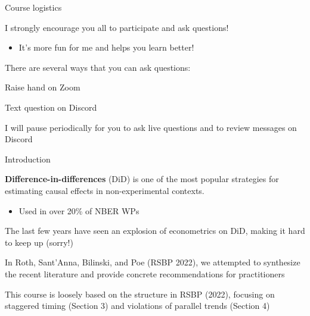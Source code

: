 \documentclass[usenames, dvipsnames, aspectratio = 169, 13pt]{beamer}
\newenvironment{wideitemize}{\itemize\addtolength{\itemsep}{10pt}}{\enditemize}
\begin{document}
\begin{frame}{Course logistics}
    \begin{wideitemize}
        \item
        I strongly encourage you all to participate and ask questions!
            \begin{itemize}
                \item 
                It's more fun for me and helps you learn better!
            \end{itemize}    
        \item
        There are several ways that you can ask questions:
        
            \begin{wideitemize}
                \item
                Raise hand on Zoom
                
                \item
                Text question on Discord
            \end{wideitemize}
            
        \item
        I will pause periodically for you to ask live questions and to review messages on Discord
    \end{wideitemize}
    
\end{frame}


\begin{frame}{Introduction}
\begin{wideitemize}
\item
\textbf{Difference-in-differences} (DiD) is one of the most popular strategies for estimating causal effects in non-experimental contexts.
\medskip
    \begin{itemize}
        \item
        Used in over 20\% of NBER WPs \citep{currie_technology_2020}
    \end{itemize}

\item
The last few years have seen an explosion of econometrics on DiD, making it hard to keep up (sorry!)

\item
In Roth, Sant'Anna, Bilinski, and Poe (RSBP 2022), we attempted to synthesize the recent literature and provide concrete recommendations for practitioners


\item
This course is loosely based on the structure in RSBP (2022), focusing on staggered timing (Section 3) and violations of parallel trends (Section 4)
\end{wideitemize}
\end{frame}
\end{document}
